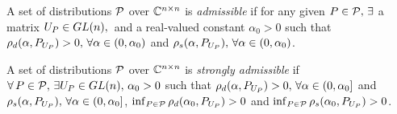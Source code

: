 \documentclass{article}
\begin{document}
\begin{definition}[Admissible]
A set of distributions $\P$ over $\C^{\ncn}$ is \emph{admissible} if  for any given $P\in \P,\,\exists$ a matrix $U_P\in \gln,\,$ and a real-valued constant $\alpha_0>0$ such that $\rhod{P_{U_P}}>0,\,\forall \alpha\in(0,\alpha_0)$ and $\rhos{P_{U_P}},\,\forall \alpha\in(0,\alpha_0)$.
\end{definition}
\begin{example}
\end{example}
\begin{definition}
A set of distributions $\P$ over $\C^{\ncn}$ is \emph{strongly admissible} if  $\forall\,P\in \P,\,\exists U_P\in \gln,\, \alpha_0>0$ such that $\rhod{P_{U_P}}>0,\,\forall \alpha\in(0,\alpha_0]$ and $\rhos{P_{U_P}},\,\forall \alpha\in(0,\alpha_0]$, $\inf_{P\in \P} \rho_d(\alpha_0,P_{U_P})>0$ and $\inf_{P\in \P} \rho_s(\alpha_0,P_{U_P})>0$.
\end{definition}
\begin{example}
\end{example}
\begin{comment}
\begin{lemma}\label{pdt}
Given a AS matrix $A$, there exists a non-singular matrix $U\in \C^{\ncn}$ such that $A=U\Lambda U^{-1}$ where $\Lambda^\dag+\Lambda$ is a real symmetric positive definite matrix.
\end{lemma}
Note that in \cref{pdt} the transformation $U\Lambda U^{-1}$ is not unique.
\begin{example}
\end{example}
\end{comment}
\begin{comment}
\begin{lemma}
Given any AS matrix $A$, there exists $\alpha_D>0,\,\alpha_R>0$ and a non-singluar matrix $U$ such that
\begin{enumerate}
\item $\rhod{\Lambda_1}>0,\,\forall \alpha \in (0,\alpha_D)$.
\item $\rhos{\Lambda_1}>0,\,\forall \alpha \in (0,\alpha_R)$.
\end{enumerate}
\end{lemma}
\begin{corollary}
There exists $\beta\eqdef\inf_{U : det(U)\neq 0,\alpha\in (0,\alpha_R)} \bu$.
\end{corollary}
\end{comment}
\end{document}
